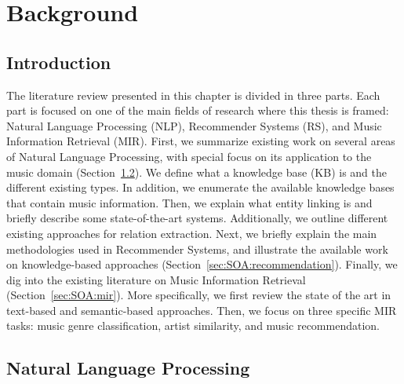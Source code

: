 
\chapter{Background}
\label{sec:SOA}

\section{Introduction}
\label{sec:SOA:Introduction}

The literature review presented in this chapter is divided in three parts. Each part is focused on one of the main fields of research where this thesis is framed: Natural Language Processing (NLP), Recommender Systems (RS), and Music Information Retrieval (MIR).
First, we summarize existing work on several areas of Natural Language Processing, with special focus on its application to the music domain (Section~\ref{sec:SOA:nlu}). 
We define what a knowledge base (KB) is and the different existing types. In addition, we enumerate the available knowledge bases that contain music information.
Then, we explain what entity linking is and briefly describe some state-of-the-art systems. Additionally, we outline different existing approaches for relation extraction. 
Next, we briefly explain the main methodologies used in Recommender Systems, and illustrate the available work on knowledge-based approaches (Section~\ref{sec:SOA:recommendation}).
Finally, we dig into the existing literature on Music Information Retrieval (Section~\ref{sec:SOA:mir}). More specifically, we first review the state of the art in text-based and semantic-based approaches. Then, we focus on three specific MIR tasks: music genre classification, artist similarity, and music recommendation.


\section{Natural Language Processing}
\label{sec:SOA:nlu}

